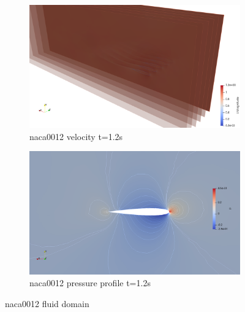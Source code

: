 \begin{figure}[htbp!]
	\centering
	\begin{subfigure}{.75\textwidth}
		\centering
		\includegraphics[width=.99\linewidth]{images/heathcote/naca0012_U.png}
		\caption{naca0012 velocity t=1.2s}
	\end{subfigure}
	\newline
	
	\centering
	\begin{subfigure}{.75\textwidth}
		\centering
		\includegraphics[width=.99\linewidth]{images/heathcote/naca0012_p.png}
		\caption{naca0012 pressure profile t=1.2s}
	\end{subfigure}
	\caption{naca0012 fluid domain}
	\label{fig:hc-fluid-sol}
\end{figure}


